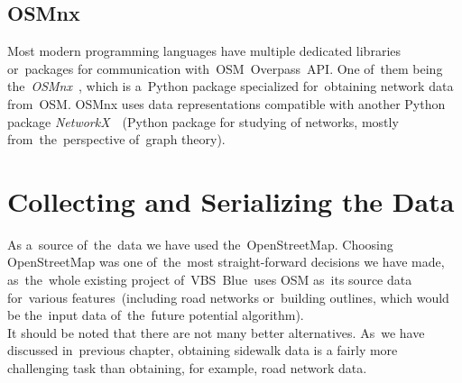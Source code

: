 \subsection{OSMnx}
Most modern programming languages have multiple dedicated libraries or~packages for communication with~OSM~Overpass~API. One of~them being the~\textit{OSMnx}~\cite{osmnx}, which is a~Python package specialized for~obtaining network data from~OSM. OSMnx uses data representations compatible with another Python package \textit{NetworkX}~\cite{networkx}~(Python package for studying of networks, mostly from~the~perspective of~graph theory).
\section{Collecting and Serializing the Data}
As a~source of~the~data we have used the~OpenStreetMap. Choosing OpenStreetMap was one of~the~most straight-forward decisions we have made, as~the~whole existing project of~VBS~Blue\, uses OSM as~its source data for~various features~(including road networks or~building outlines, which would be the~input data of~the~future potential algorithm). \\
It should be noted that there are not many better alternatives. As~we have discussed in~previous chapter, obtaining sidewalk data is a fairly more challenging task than obtaining, for example, road network data. \\
